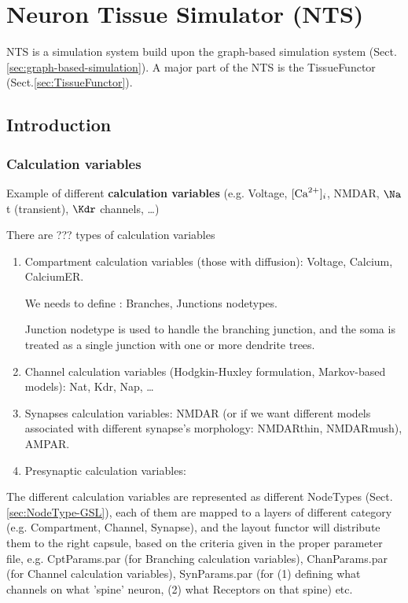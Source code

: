 \chapter{Neuron Tissue Simulator (NTS)}
\label{chap:NTS}

NTS is a simulation system build upon the graph-based simulation system
(Sect.\ref{sec:graph-based-simulation}). A major part of the NTS is the
TissueFunctor (Sect.\ref{sec:TissueFunctor}).

\section{Introduction}


\subsection{Calculation variables}
\label{sec:calculation-variables}

Example of different {\bf calculation variables} (e.g. Voltage, $[{\text{Ca}^{2+}}]_i$,
NMDAR, $\Na$t (transient), $\Kdr$ channels, \ldots)

There are ??? types of calculation variables
\begin{enumerate}
  \item Compartment calculation variables (those with diffusion): Voltage,
  Calcium, CalciumER.

We needs to define : Branches, Junctions nodetypes. 

Junction nodetype is used to handle the branching junction, and the soma is
treated as a single junction with one or more dendrite trees.
  
  \item Channel calculation variables (Hodgkin-Huxley formulation,
  Markov-based models): Nat, Kdr, Nap, \ldots
  
  \item Synapses calculation variables: NMDAR (or if we want different models
  associated with different synapse's morphology: NMDARthin, NMDARmush), AMPAR.
  
  \item Presynaptic calculation variables:
\end{enumerate}

The different calculation variables are represented as different NodeTypes
(Sect.\ref{sec:NodeType-GSL}), each of them are mapped to a layers of different
category (e.g. Compartment, Channel, Synapse), and the layout functor will
distribute them to the right capsule, based on the criteria given in the proper
parameter file, e.g. CptParams.par (for Branching calculation variables),
ChanParams.par (for Channel calculation variables), SynParams.par (for (1)
defining what channels on what 'spine' neuron, (2) what Receptors on that spine)
etc.

